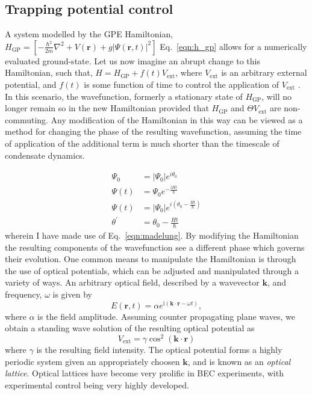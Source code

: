 {\subsection{Trapping potential control}
A system modelled by the GPE Hamiltonian, $H_{\textrm{GP}} = \left[-\frac{\hbar^2}{2m}\nabla^2 + V(\textbf{r}) + g\vert\Psi(\textbf{r},t)\vert^2 \right]$ Eq.~\ref{eqn:h_gp} allows for a numerically evaluated ground-state. Let us now imagine an abrupt change to this Hamiltonian, such that, $H = H_{\textrm{GP}} + f(t) V_{\textrm{ext}}$, where  $V_{\textrm{ext}}$ is an arbitrary external potential, and $f(t)$ is some function of time to control the application of $V_{\textrm{ext}}$ . In this scenario, the wavefunction, formerly a stationary state of $H_{\textrm{GP}}$, will no longer remain so in the new Hamiltonian provided that $H_{\textrm{GP}} $ and $\Theta V_{\textrm{ext}}$ are non-commuting. Any modification of the Hamiltonian in this way can be viewed as a method for changing the phase of the resulting wavefunction, assuming the time of application of the additional term is much shorter than the timescale of condensate dynamics.

\begin{subequations}
\begin{align}
    \Psi_0 &= |\Psi_0|e^{i\theta_0} \\
    \Psi(t) &= \Psi_0 e^{-\frac{i H t}{\hbar}} \\
    \Psi(t) &= |\Psi_0| e^{i\left(\theta_0 - \frac{H t}{\hbar}\right)} \\
    \theta^{'} &= \theta_0 - \frac{H t}{\hbar}
\end{align}
\end{subequations}
wherein I have made use of Eq.~\ref{eqn:madelung}. By modifying the Hamiltonian the resulting components of the wavefunction see a different phase which governs their evolution. One common means to manipulate the Hamiltonian is through the use of optical potentials, which can be adjusted and manipulated through a variety of ways. An arbitrary optical field, described by a wavevector $\mathbf{k}$, and frequency, $\omega$ is given by
\begin{equation}
    E(\mathbf{r},t) = \alpha e^{\textrm{i}\left(\mathbf{k}\cdot\mathbf{r} - \omega t\right)},
\end{equation}
where $\alpha$ is the field amplitude. Assuming counter propagating plane waves, we obtain a standing wave solution of the resulting optical potential as
\begin{equation}
    V_{\textrm{ext}} = \gamma \cos^2 (\mathbf{k} \cdot \mathbf{r})
\end{equation}
where $\gamma$ is the resulting field intensity. The optical potential forms a highly periodic system given an appropriately choosen $\mathbf{k}$, and is known as an \textit{optical lattice}. Optical lattices have become very prolific in BEC experiments, with experimental control being very highly developed.

}
